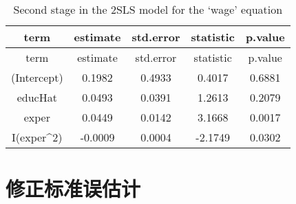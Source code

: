 \documentclass[
]{article}
\begin{document}
\begin{longtable}[]{@{}ccccc@{}}
\caption{Second stage in the 2SLS model for the `wage'
equation}\tabularnewline
\toprule
term & estimate & std.error & statistic & p.value\tabularnewline
\midrule
\endfirsthead
\toprule
term & estimate & std.error & statistic & p.value\tabularnewline
\midrule
\endhead
(Intercept) & 0.1982 & 0.4933 & 0.4017 & 0.6881\tabularnewline
educHat & 0.0493 & 0.0391 & 1.2613 & 0.2079\tabularnewline
exper & 0.0449 & 0.0142 & 3.1668 & 0.0017\tabularnewline
I(exper\^{}2) & -0.0009 & 0.0004 & -2.1749 & 0.0302\tabularnewline
\bottomrule
\end{longtable}

\hypertarget{ux4feeux6b63ux6807ux51c6ux8befux4f30ux8ba1}{%
\section{修正标准误估计}\label{ux4feeux6b63ux6807ux51c6ux8befux4f30ux8ba1}}
\end{document}
